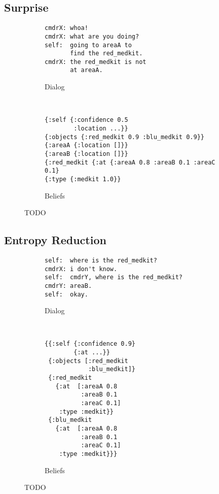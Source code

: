 \documentclass[12pt]{article}
\begin{document}
\subsection{Surprise}
\begin{figure}[h]
  \centering
  \begin{subfigure}[t]{0.4\textwidth}
    \centering
\begin{verbatim}
cmdrX: whoa!
cmdrX: what are you doing?
self:  going to areaA to
       find the red_medkit.
cmdrX: the red_medkit is not
       at areaA.
\end{verbatim}
    \label{fig:surprise_text}
    \caption{Dialog}
  \end{subfigure}
  ~\quad
  \begin{subfigure}[t]{0.4\textwidth}
    \centering
\begin{verbatim}
{:self {:confidence 0.5
        :location ...}}
{:objects {:red_medkit 0.9 :blu_medkit 0.9}}
{:areaA {:location []}}
{:areaB {:location []}}
{:red_medkit {:at {:areaA 0.8 :areaB 0.1 :areaC 0.1}
{:type {:medkit 1.0}}
\end{verbatim}
    \label{fig:surprise_beliefs}
    \caption{Beliefs}
  \end{subfigure}
  \caption{TODO}
  \label{fig:surprise}
\end{figure}


\subsection{Entropy Reduction}
\begin{figure}[h]
  \centering
  \begin{subfigure}[t]{0.4\textwidth}
    \centering
\begin{verbatim}
self:  where is the red_medkit?
cmdrX: i don't know.
self:  cmdrY, where is the red_medkit?
cmdrY: areaB.
self:  okay.
\end{verbatim}
    \label{fig:er_text}
    \caption{Dialog}
  \end{subfigure}
  ~\quad
  \begin{subfigure}[t]{0.4\textwidth}
    \centering
\begin{verbatim}
{{:self {:confidence 0.9}
        {:at ...}}
 {:objects [:red_medkit 
            :blu_medkit]}
 {:red_medkit
   {:at  [:areaA 0.8
          :areaB 0.1
          :areaC 0.1]
    :type :medkit}}
 {:blu_medkit
   {:at  [:areaA 0.8
          :areaB 0.1
          :areaC 0.1]
    :type :medkit}}}
\end{verbatim}
    \label{fig:er_beliefs}
    \caption{Beliefs}
  \end{subfigure}
  \caption{TODO}
  \label{fig:er}
\end{figure}
\end{document}
